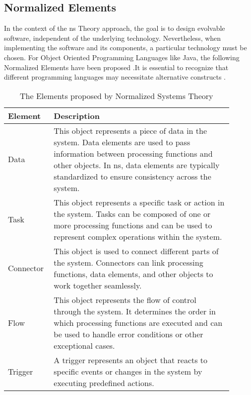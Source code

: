\subsection{Normalized Elements} \label{subsec_ns_elements} 

In the context of the \gls{ns} Theory approach, the goal is to design evolvable software,
independent of the underlying technology. Nevertheless, when implementing the software and
its components, a particular technology must be chosen. For Object Oriented Programming
Languages like Java, the following Normalized Elements have been proposed
\parencite[363-398]{mannaert_normalized_2016}.It is essential to recognize that different
programming languages may necessitate alternative constructs
\parencite[364]{mannaert_normalized_2016}.

\begin{table}[H]
    \begin{tabular}{ p{0.15\linewidth} p{0.75\linewidth}}
        \hline
        \textbf{Element} & \textbf{Description} \\ 
        \hline
        Data & This object represents a piece of data in the system. Data elements are
        used to pass information between processing functions and other objects. In
        \gls{ns}, data elements are typically standardized to ensure consistency across
        the system.\\ \midrule

        Task & This object represents a specific task or action in the system. Tasks can
        be composed of one or more processing functions and can be used to represent
        complex operations within the system.\\ \midrule

        Connector & This object is used to connect different parts of the system.
        Connectors can link processing functions, data elements, and other objects to work
        together seamlessly.\\ \midrule

        Flow & This object represents the flow of control through the system.
        It determines the order in which processing functions are executed and can be used
        to handle error conditions or other exceptional cases.\\ \midrule

        Trigger & A trigger represents an object that reacts to specific events or changes in the system
        by executing predefined actions.\\

        \bottomrule
    \end{tabular}
    \caption{The Elements proposed by Normalized Systems Theory}
    \label{ns_element}
\end{table}
